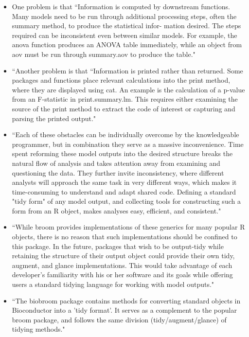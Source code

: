 \documentclass[pdftex,english,11pt,parskip=half]{scrartcl}
\begin{document}
\begin{itemize}
\item One problem is that ``Information is computed by downstream functions. Many models need to be run through additional processing steps, often the summary method, to produce the statistical infor- mation desired. The steps required can be inconsistent even between similar models. For example, the anova function produces an ANOVA table immediately, while an object from aov must be run through summary.aov to produce the table." \cite{robinson2014broom}
\item ``Another problem is that ``Information is printed rather than returned. Some packages and functions place relevant calculations into the print method, where they are displayed using cat. An example is the calculation of a p-value from an F-statistic in print.summary.lm. This requires either examining the source of the print method to extract the code of interest or capturing and parsing the printed output." \cite{robinson2014broom}
\item ``Each of these obstacles can be individually overcome by the knowledgeable programmer, but in combination they serve as a massive inconvenience. Time spent reforming these model outputs into the desired structure breaks the natural flow of analysis and takes attention away from examining and questioning the data. They further invite inconsistency, where different analysts will approach the same task in very different ways, which makes it time-consuming to understand and adapt shared code. Defining a standard "tidy form" of any model output, and collecting tools for constructing such a form from an R object, makes analyses easy, efficient, and consistent." \cite{robinson2014broom}
\item ``While broom provides implementations of these generics for many popular R objects, there is no reason that such implementations should be confined to this package. In the future, packages that wish to be output-tidy while retaining the structure of their output object could provide their own tidy, augment, and glance implementations. This would take advantage of each developer’s familiarity with his or her software and its goals while offering users a standard tidying language for working with model outputs." \cite{robinson2014broom}
\item ``The biobroom package contains methods for converting standard objects in Bioconductor into a 'tidy format'. It serves as a complement to the popular broom package, and follows the same division (tidy/augment/glance) of tidying methods." \cite{biobroom}

\end{itemize}
\end{document}
